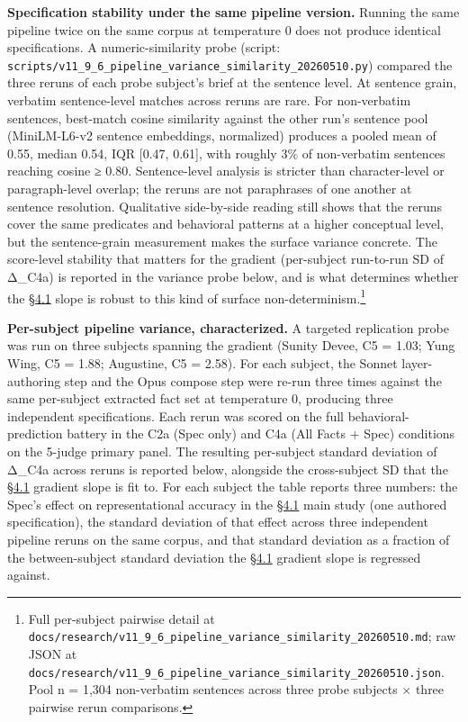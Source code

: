 \textbf{Specification stability under the same pipeline version.}
Running the same pipeline twice on the same corpus at temperature 0 does
not produce identical specifications. A numeric-similarity probe
(script:
\texttt{scripts/v11\_9\_6\_pipeline\_variance\_similarity\_20260510.py})
compared the three reruns of each probe subject's brief at the sentence
level. At sentence grain, verbatim sentence-level matches across reruns
are rare. For non-verbatim sentences, best-match cosine similarity
against the other run's sentence pool (MiniLM-L6-v2 sentence embeddings,
normalized) produces a pooled mean of 0.55, median 0.54, IQR {[}0.47,
0.61{]}, with roughly 3\% of non-verbatim sentences reaching cosine ≥
0.80. Sentence-level analysis is stricter than character-level or
paragraph-level overlap; the reruns are not paraphrases of one another
at sentence resolution. Qualitative side-by-side reading still shows
that the reruns cover the same predicates and behavioral patterns at a
higher conceptual level, but the sentence-grain measurement makes the
surface variance concrete. The score-level stability that matters for
the gradient (per-subject run-to-run SD of Δ\_C4a) is reported in the
variance probe below, and is what determines whether the \hyperref[the-cross-subject-gradient-and-its-per-question-mechanism]{§4.1} slope is
robust to this kind of surface non-determinism.\footnote{Full
  per-subject pairwise detail at
  \texttt{docs/research/v11\_9\_6\_pipeline\_variance\_similarity\_20260510.md};
  raw JSON at
  \texttt{docs/research/v11\_9\_6\_pipeline\_variance\_similarity\_20260510.json}.
  Pool n = 1,304 non-verbatim sentences across three probe subjects ×
  three pairwise rerun comparisons.}

\textbf{Per-subject pipeline variance, characterized.} A targeted
replication probe was run on three subjects spanning the gradient
(Sunity Devee, C5 = 1.03; Yung Wing, C5 = 1.88; Augustine, C5 = 2.58).
For each subject, the Sonnet layer-authoring step and the Opus compose
step were re-run three times against the same per-subject extracted fact
set at temperature 0, producing three independent specifications. Each
rerun was scored on the full behavioral-prediction battery in the C2a
(Spec only) and C4a (All Facts + Spec) conditions on the 5-judge primary
panel. The resulting per-subject standard deviation of Δ\_C4a across
reruns is reported below, alongside the cross-subject SD that the \hyperref[the-cross-subject-gradient-and-its-per-question-mechanism]{§4.1}
gradient slope is fit to. For each subject the table reports three
numbers: the Spec's effect on representational accuracy in the \hyperref[the-cross-subject-gradient-and-its-per-question-mechanism]{§4.1} main
study (one authored specification), the standard deviation of that
effect across three independent pipeline reruns on the same corpus, and
that standard deviation as a fraction of the between-subject standard
deviation the \hyperref[the-cross-subject-gradient-and-its-per-question-mechanism]{§4.1} gradient slope is regressed against.

